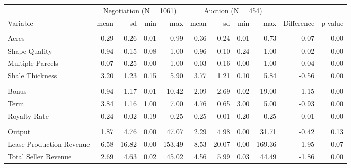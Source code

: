 
\begin{tabular}{lrrrrrrrrrr}
\toprule
\multicolumn{1}{c}{ } & \multicolumn{4}{c}{Negotiation (N = 1061)} & \multicolumn{4}{c}{Auction (N = 454)} \\
\cmidrule(l{3pt}r{3pt}){2-5} \cmidrule(l{3pt}r{3pt}){6-9}
Variable & mean & sd & min & max & mean & sd & min & max & Difference & p-value\\
\midrule
\addlinespace[0.3em]
\multicolumn{11}{l}{\textbf{Land Characteristics}}\\
\hspace{1em}Acres & 0.29 & 0.26 & 0.01 & 0.99 & 0.36 & 0.24 & 0.01 & 0.73 & -0.07 & 0.00\\
\hspace{1em}Shape Quality & 0.94 & 0.15 & 0.08 & 1.00 & 0.96 & 0.10 & 0.24 & 1.00 & -0.02 & 0.00\\
\hspace{1em}Multiple Parcels & 0.07 & 0.25 & 0.00 & 1.00 & 0.03 & 0.16 & 0.00 & 1.00 & 0.04 & 0.00\\
\hspace{1em}Shale Thickness & 3.20 & 1.23 & 0.15 & 5.90 & 3.77 & 1.21 & 0.10 & 5.84 & -0.56 & 0.00\\
\addlinespace[0.3em]
\multicolumn{11}{l}{\textbf{Lease Characteristics}}\\
\hspace{1em}Bonus & 0.94 & 1.17 & 0.01 & 10.42 & 2.09 & 2.69 & 0.02 & 19.00 & -1.15 & 0.00\\
\hspace{1em}Term & 3.84 & 1.16 & 1.00 & 7.00 & 4.76 & 0.65 & 3.00 & 5.00 & -0.93 & 0.00\\
\hspace{1em}Royalty Rate & 0.24 & 0.02 & 0.19 & 0.25 & 0.25 & 0.01 & 0.20 & 0.25 & -0.01 & 0.00\\
\addlinespace[0.3em]
\multicolumn{11}{l}{\textbf{Lease Outcomes}}\\
\hspace{1em}Output & 1.87 & 4.76 & 0.00 & 47.07 & 2.29 & 4.98 & 0.00 & 31.71 & -0.42 & 0.13\\
\hspace{1em}Lease Production Revenue & 6.58 & 16.82 & 0.00 & 153.49 & 8.53 & 20.07 & 0.00 & 169.36 & -1.95 & 0.07\\
\hspace{1em}Total Seller Revenue & 2.69 & 4.63 & 0.02 & 45.02 & 4.56 & 5.99 & 0.03 & 44.49 & -1.86 & 0.00\\
\bottomrule
\end{tabular}
